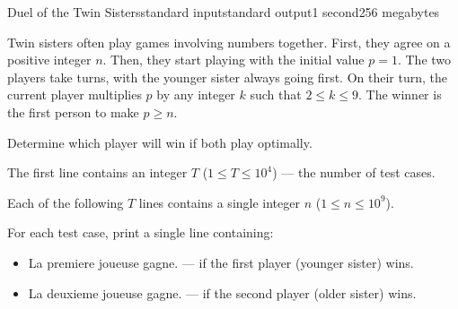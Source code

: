 \begin{problem}{Duel of the Twin Sisters}{standard input}{standard output}{1 second}{256 megabytes}

Twin sisters often play games involving numbers together. 
First, they agree on a positive integer $n$. 
Then, they start playing with the initial value $p = 1$. 
The two players take turns, with the younger sister always going first. On their turn, the current player multiplies $p$ by any integer $k$ such that $2 \le k \le 9$.
The winner is the first person to make $p \ge n$.

Determine which player will win if both play optimally.

\InputFile
The first line contains an integer $T$ ($1 \le T \le 10^4$) --- the number of test cases.\

Each of the following $T$ lines contains a single integer $n$ ($1 \le n \le 10^9$).

\OutputFile
For each test case, print a single line containing:

\begin{itemize}
    \item La premiere joueuse gagne. --- if the first player (younger sister) wins.
    \item La deuxieme joueuse gagne. --- if the second player (older sister) wins.
\end{itemize}

\Example

\begin{example}
%
\end{example}

\end{problem}

